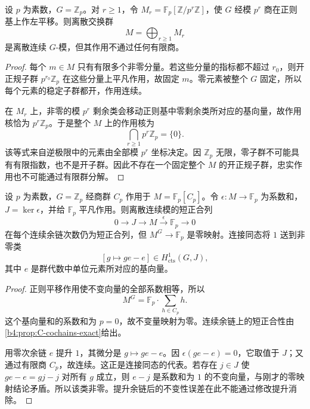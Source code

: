 \begin{proposition}\label{b4:prop:C-no-common-action-quotient}
	设 \(p\) 为素数，\(G=\mathbb Z_p\)。对 \(r\ge1\)，令 \(M_r=\mathbb F_p[\mathbb Z/p^r\mathbb Z]\)，使 \(G\) 经模 \(p^r\) 商在正则基上作左平移。则离散交换群
	\[
		M=\bigoplus_{r\ge1}M_r
	\]
	是离散连续 \(G\)-模，但其作用不通过任何有限商。
\end{proposition}
\begin{proof}
	每个 \(m\in M\) 只有有限多个非零分量。若这些分量的指标都不超过 \(r_0\)，则开正规子群 \(p^{r_0}\mathbb Z_p\) 在这些分量上平凡作用，故固定 \(m\)。零元素被整个 \(G\) 固定，所以每个元素的稳定子群都开，作用连续。

	在 \(M_r\) 上，非零的模 \(p^r\) 剩余类会移动正则基中零剩余类所对应的基向量，故作用核恰为 \(p^r\mathbb Z_p\)。于是整个 \(M\) 上的作用核为
	\[
		\bigcap_{r\ge1}p^r\mathbb Z_p=\{0\}.
	\]
	该等式来自逆极限中的元素由全部模 \(p^r\) 坐标决定。因 \(\mathbb Z_p\) 无限，零子群不可能具有有限指数，也不是开子群。因此不存在一个固定整个 \(M\) 的开正规子群，忠实作用也不可能通过有限群分解。
\end{proof}

\begin{proposition}\label{b4:prop:C-invariant-lift-obstruction}
	设 \(p\) 为素数，\(G=\mathbb Z_p\) 经商群 \(C_p\) 作用于 \(M=\mathbb F_p[C_p]\)。令 \(\epsilon:M\to\mathbb F_p\) 为系数和，\(J=\ker\epsilon\)，并给 \(\mathbb F_p\) 平凡作用。则离散连续模的短正合列
	\[
		0\longrightarrow J\longrightarrow M \xrightarrow{\epsilon}\mathbb F_p\longrightarrow0
	\]
	在每个连续余链次数仍为短正合列，但 \(M^G\to\mathbb F_p\) 是零映射。连接同态将 \(1\) 送到非零类
	\[
		[g\mapsto ge-e]\in H^1_{\mathrm{cts}}(G,J),
	\]
	其中 \(e\) 是群代数中单位元素所对应的基向量。
\end{proposition}
\begin{proof}
	正则平移作用使不变向量的全部系数相等，所以
	\[
		M^G=\mathbb F_p\cdot\sum_{h\in C_p}h.
	\]
	这个基向量和的系数和为 \(p=0\)，故不变量映射为零。连续余链上的短正合性由\cref{b4:prop:C-cochains-exact}给出。

	用零次余链 \(e\) 提升 \(1\)，其微分是 \(g\mapsto ge-e\)。因 \(\epsilon(ge-e)=0\)，它取值于 \(J\)；又通过有限商 \(C_p\)，故连续。这正是连接同态的代表。若存在 \(j\in J\) 使 \(ge-e=gj-j\) 对所有 \(g\) 成立，则 \(e-j\) 是系数和为 \(1\) 的不变向量，与刚才的零映射结论矛盾。所以该类非零。提升余链后的不变性误差在此不能通过修改提升消除。
\end{proof}
